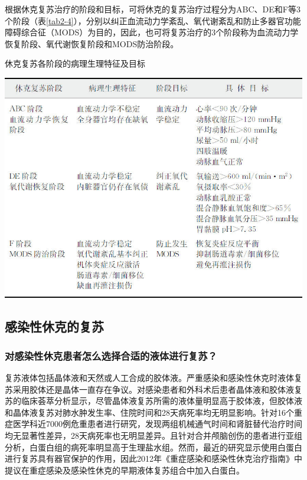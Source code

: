 根据休克复苏治疗的阶段和目标，可将休克的复苏治疗过程分为ABC、DE和F等3个阶段（表\ref{tab2-4}），分别以纠正血流动力学紊乱、氧代谢紊乱和防止多器官功能障碍综合征（MODS）为目的，因此，也可将复苏治疗的3个阶段称为血流动力学恢复阶段、氧代谢恢复阶段和MODS防治阶段。

\begin{table}[htbp]
\centering
\caption{休克复苏各阶段的病理生理特征及目标}
\label{tab2-4}
\includegraphics[width=\textwidth,height=\textheight,keepaspectratio]{./images/Image00020.jpg}
\end{table}

\subsection{感染性休克的复苏}

\subsubsection{对感染性休克患者怎么选择合适的液体进行复苏？}

复苏液体包括晶体液和天然或人工合成的胶体液。严重感染和感染性休克时液体复苏采用胶体还是晶体一直存在争议。对感染患者和外科术后患者晶体液和胶体液复苏的临床荟萃分析显示，尽管晶体液复苏所需的液体量明显高于胶体液，但胶体液和晶体液复苏对肺水肿发生率、住院时间和28天病死率均无明显影响。针对16个重症医学科近7000例危重患者进行研究，发现两组机械通气时间和肾脏替代治疗时间均无显著性差异，28天病死率也无明显差异。且针对合并颅脑创伤的患者进行亚组分析，白蛋白组的病死率明显高于生理盐水组。然而，最近的研究显示使用白蛋白进行复苏具有器官保护的作用，因此2012年《重症感染和感染性休克治疗指南》中提议在重症感染及感染性休克的早期液体复苏组合中加入白蛋白。

